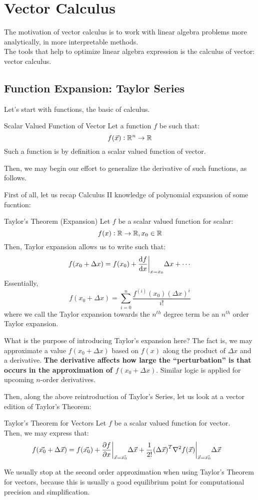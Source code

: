 \chapter{Vector Calculus}
The motivation of vector calculus is to work with linear algebra problems more analytically, in more interpretable methods. \\
The tools that help to optimize linear algebra expression is the calculus of vector: vector calculus.

\section{Function Expansion: Taylor Series}
Let's start with functions, the basic of calculus.
\begin{ln-define}{Scalar Valued Function of Vector}{}
    Let a function $f$ be such that:
    \[
        f(\vec{x}): \mathbb{R}^n \rightarrow \mathbb{R}
    \]
    Such a function is by definition a scalar valued function of vector.
\end{ln-define}
Then, we may begin our effort to generalize the derivative of such functions, as follows.

First of all, let us recap Calculus II knowledge of polynomial expansion of some fucntion:
\begin{ln-theorem}{Taylor's Theorem (Expansion)}{}
    Let $f$ be a scalar valued function for scalar:
    \[
        f(x) : \mathbb{R} \rightarrow \mathbb{R}, x_0 \in \mathbb{R}
    \]
    Then, Taylor expansion allows us to write such that:
    \[
        f(x_0 + \Delta x) = f(x_0) + \dv{f}{x} \bigg|_{x = x_0} \Delta x + \cdots
    \]
    Essentially, 
    \[
        f(x_0 + \Delta x) = \sum_{i = 0}^n \frac{f^{(i)}(x_0) {(\Delta x)}^i}{i!}
    \]
    where we call the Taylor expansion towards the $n^{th}$ degree term be an $n^{th}$ order Taylor expansion.
\end{ln-theorem}
What is the purpose of introducing Taylor's expansion here? The fact is, we may approximate a value $f(x_0 + \Delta x)$ based on $f(x)$ along the product of $\Delta x$ and a derivative.
\textbf{The derivative affects how large the ``perturbation'' is that occurs in the approximation of $f(x_0 + \Delta x)$}.
Similar logic is applied for upcoming $n$-order derivatives.

Then, along the above reintroduction of Taylor's Series, let us look at a vector edition of Taylor's Theorem:
\begin{ln-theorem}{Taylor's Theorem for Vectors}{}
    Let $f$ be a scalar valued function for vector. \\
    Then, we may express that:
    \begin{align*}
        f(\vec{x_0} + \Delta \vec{x})
        &= f(\vec{x_0}) + \pdv{f}{x} \bigg|_{\vec{x} = \vec{x_0}} \Delta \vec{x} + \frac{1}{2!} {(\Delta \vec{x})}^T \nabla^2 f(\vec{x}) \bigg|_{\vec{x} = \vec{x_0}} \Delta \vec{x}
    \end{align*}
\end{ln-theorem}
We usually stop at the second order approximation when using Taylor's Theorem for vectors, because this is usually a good equilibrium point for computational precision and simplification.

